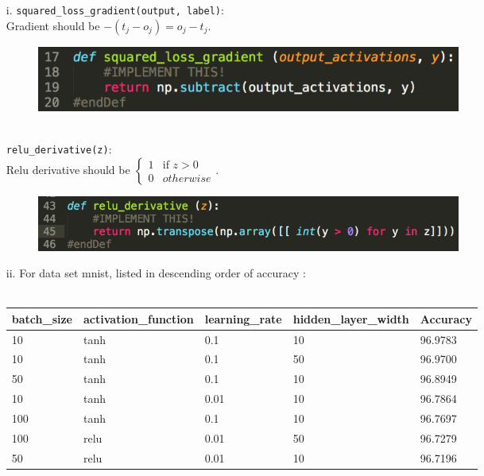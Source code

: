 \item[(b)]
	\begin{itemize}  
	\item[i.]	
	{\tt squared\_loss\_gradient(output, label)}:\\
	Gradient should be $-(t_j-o_j)= o_j-t_j$.
	\begin{figure}[h]
  		\centering
    	\includegraphics[width=0.7\textwidth]{fig1.png}
	\end{figure}\\
	{\tt relu\_derivative(z)}:\\
	Relu derivative should be 
	$\begin{cases}
		1 & \mbox{if } z > 0 \\
		0 & otherwise
	\end{cases}$.
	\begin{figure}[h]
  		\centering
    	\includegraphics[width=0.7\textwidth]{fig2.png}
	\end{figure}
	\item[ii.]
	 For data set mnist, listed in descending order of accuracy : \\\\
	\begin{tabular}{ | l | l | l | l | l |  }
	\hline
		batch\_size & activation\_function & learning\_rate & hidden\_layer\_width & Accuracy   \\ \hline
		10 & tanh & 0.1 & 10 & 96.9783  \\ \hline
		10 & tanh & 0.1 & 50 & 96.9700  \\ \hline
		50 & tanh & 0.1 & 10 & 96.8949  \\ \hline
		10 & tanh & 0.01 & 10 & 96.7864  \\ \hline
		100 & tanh & 0.1 & 10 & 96.7697  \\ \hline
		100 & relu & 0.01 & 50 & 96.7279  \\ \hline
		50 & relu & 0.01 & 10 & 96.7196  \\ \hline

\end{tabular}
\end{itemize}
